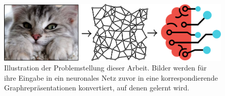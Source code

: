 \begin{figure}[t]
\centering
\includegraphics[width=\textwidth]{bilder/problemstellung.png}
\caption[Problemstellung]{Illustration der Problemstellung dieser Arbeit.
Bilder werden für ihre Eingabe in ein neuronales Netz zuvor in eine korrespondierende Graphrepräsentationen konvertiert, auf denen gelernt wird.}
\label{fig:problemstellung}
\end{figure}
